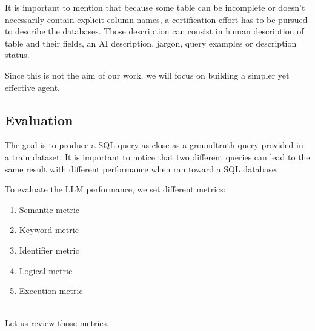 \documentclass[12pt,a4paper]{article}
\begin{document}
It is important to mention that because some table can be incomplete or doesn't necessarily contain explicit column names, a certification effort has to be pursued to describe the databases. Those description can consist in human description of table and their fields, an AI description, jargon, query examples or description status.

Since this is not the aim of our work, we will focus on building a simpler yet effective agent.
\vspace{1cm}


\subsection*{Evaluation}
The goal is to produce a SQL query as close as a groundtruth query provided in a train dataset. It is important to notice that two different queries can lead to the same result with different performance when ran toward a SQL database.

To evaluate the LLM performance, we set different metrics:
\begin{enumerate}
    \item Semantic metric
    \item Keyword metric
    \item Identifier metric
    \item Logical metric
    \item Execution metric
\end{enumerate}

\\
Let us review those metrics.
\end{document}
